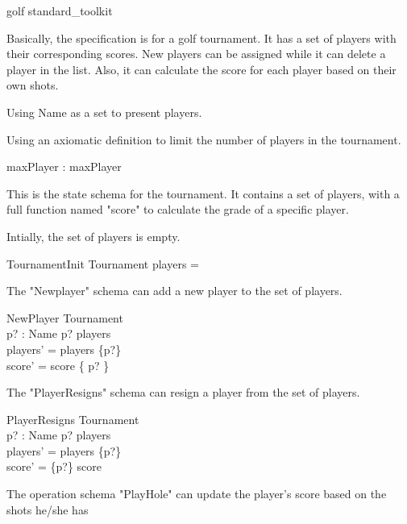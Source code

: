 \documentclass{llncs}
\begin{document}
\begin{zsection}
\SECTION golf \parents standard\_toolkit
\end{zsection}

Basically, the specification is for a golf tournament. It has a set of players with their corresponding
scores. New players can be assigned while it can delete a player in the list. Also, it can calculate
the score for each player based on their own shots.


Using Name as a set to present players.
\begin{zed}
[Name]
\end{zed}
Using an axiomatic definition to limit the number of players in the tournament.
\begin{axdef}
maxPlayer : \nat
\where maxPlayer 
\end{axdef}
This is the state schema for the tournament. It contains a set of players, with a full function
named "score" to calculate the grade of a specific player.

Intially, the set of players is empty.
\begin{schema}{TournamentInit}
Tournament
\where players = \emptyset
\end{schema}

The "Newplayer" schema can add a new player to the set of players.
\begin{schema}{NewPlayer}
\Delta Tournament \\
p? : Name
\where p? \notin players \\
players' = players \cup \{p?\} \\
score' = score \cup \{ p?  \}
\end{schema}

The "PlayerResigns" schema can resign a player from the set of players.
\begin{schema}{PlayerResigns}
\Delta Tournament \\
p? : Name
\where p? \in players\\
players' = players \setminus \{p?\} \\
score' = \{p?\} \ndres score
\end{schema}

The operation schema "PlayHole" can update the player's score based on the shots he/she has
\end{document}

